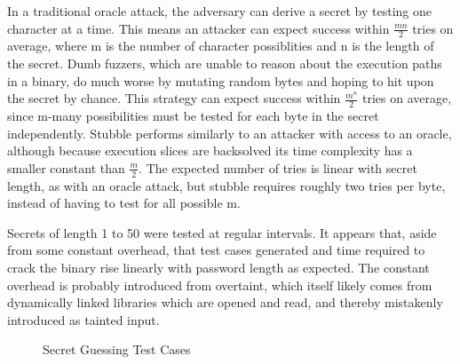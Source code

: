 \documentclass[11pt,expanded,copyright]{fsuthesis}
\begin{document}
In a traditional oracle attack, the adversary can derive a secret by testing one character at a time. This means an attacker can expect success within $\frac{mn}{2}$ tries on average, where m is the number of character possiblities and n is the length of the secret. Dumb fuzzers, which are unable to reason about the execution paths in a binary, do much worse by mutating random bytes and hoping to hit upon the secret by chance. This strategy can expect success within $\frac{m^n}{2}$ tries on average, since m-many possibilities must be tested for each byte in the secret independently. Stubble performs similarly to an attacker with access to an oracle, although because execution slices are backsolved its time complexity has a smaller constant than $\frac{m}{2}$. The expected number of tries is linear with secret length, as with an oracle attack, but stubble requires roughly two tries per byte, instead of having to test for all possible m.

Secrets of length 1 to 50 were tested at regular intervals. It appears that, aside from some constant overhead, that test cases generated and time required to crack the binary rise linearly with password length as expected. The constant overhead is probably introduced from overtaint, which itself likely comes from dynamically linked libraries which are opened and read, and thereby mistakenly introduced as tainted input.

\begin{figure}
\caption{Secret Guessing Test Cases}

\end{figure}
\end{document}
